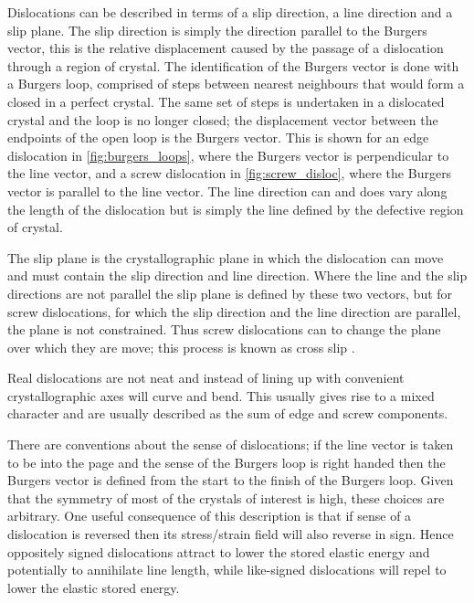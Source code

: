 Dislocations can be described in terms of a slip direction, a line direction and a slip plane. The slip direction is simply the direction parallel to the Burgers vector, this is the relative displacement caused by the passage of a dislocation through a region of crystal. The identification of the Burgers vector is done with a Burgers loop, comprised of steps between nearest neighbours that would form a closed in a perfect crystal. The same set of steps is undertaken in a dislocated crystal and the loop is no longer closed; the displacement vector between the endpoints of the open loop is the Burgers vector. This is shown for an edge dislocation in \autoref{fig:burgers_loops}, where the Burgers vector is perpendicular to the line vector, and a screw dislocation in \autoref{fig:screw_disloc}, where the Burgers vector is parallel to the line vector. The line direction can and does vary along the length of the dislocation but is simply the line defined by the defective region of crystal. 

The slip plane is the crystallographic plane in which the dislocation can move and must contain the slip direction and line direction. Where the line and the slip directions are not parallel the slip plane is defined by these two vectors, but for screw dislocations, for which the slip direction and the line direction are parallel, the plane is not constrained. Thus screw dislocations can to change the plane over which they are move; this process is known as cross slip \cite{Hirth_Lothe1982intro}.

Real dislocations are not neat and instead of lining up with convenient crystallographic axes will curve and bend. This usually gives rise to a mixed character and are usually described as the sum of edge and screw components.

There are conventions about the sense of dislocations; if the line vector is taken to be into the page and the sense of the Burgers loop is right handed then the Burgers vector is defined from the start to the finish of the Burgers loop. Given that the symmetry of most of the crystals of interest is high, these choices are arbitrary. One useful consequence of this description is that if sense of a dislocation is reversed then its stress/strain field will also reverse in sign. Hence oppositely signed dislocations attract to lower the stored elastic energy and potentially to annihilate line length, while like-signed dislocations will repel to lower the elastic stored energy.



